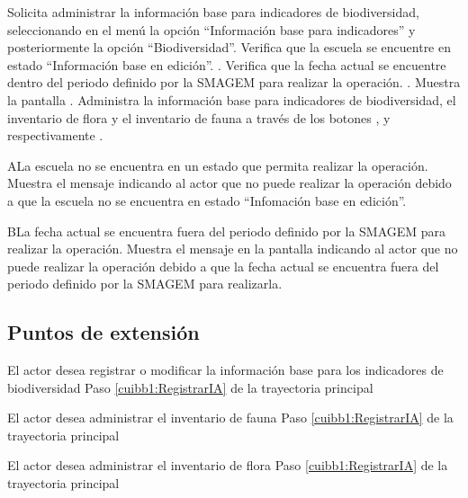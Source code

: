  \begin{UCtrayectoria}
    \UCpaso[\UCactor] Solicita administrar la información base para indicadores de biodiversidad, seleccionando en el menú  la opción ``Información base para indicadores'' y posteriormente la opción ``Biodiversidad''. 
    \UCpaso[\UCsist] Verifica que la escuela se encuentre en estado ``Información base en edición''. .
    \UCpaso[\UCsist] Verifica que la fecha actual se encuentre dentro del periodo definido por la SMAGEM para realizar la operación. .
    \UCpaso[\UCsist] Muestra la pantalla .
    \UCpaso[\UCactor] Administra la información base para indicadores de biodiversidad, el inventario de flora y el inventario de fauna a través de los botones \botEdit, \botReg y \botReg respectivamente . \label{cuibb1:RegistrarIA}
 \end{UCtrayectoria}
 
 \begin{UCtrayectoriaA}{A}{La escuela no se encuentra en un estado que permita realizar la operación.}
    \UCpaso[\UCsist] Muestra el mensaje  indicando al actor que no puede realizar la operación debido a que la escuela no se encuentra en estado ``Infomación base en edición''.
 \end{UCtrayectoriaA}

     \begin{UCtrayectoriaA}{B}{La fecha actual se encuentra fuera del periodo definido por la SMAGEM para realizar la operación.}
    \UCpaso[\UCsist] Muestra el mensaje  en la pantalla  indicando al actor que no puede realizar la operación debido a que la fecha actual se encuentra fuera del periodo definido por la SMAGEM para realizarla. 
 \end{UCtrayectoriaA}

\subsection{Puntos de extensión}

\UCExtensionPoint
{El actor desea registrar o modificar la información base para los indicadores de biodiversidad}
{ Paso \ref{cuibb1:RegistrarIA} de la trayectoria principal}
{}

\UCExtensionPoint
{El actor desea administrar el inventario de fauna}
{ Paso \ref{cuibb1:RegistrarIA} de la trayectoria principal}
{}

\UCExtensionPoint
{El actor desea administrar el inventario de flora}
{ Paso \ref{cuibb1:RegistrarIA} de la trayectoria principal}
{}
